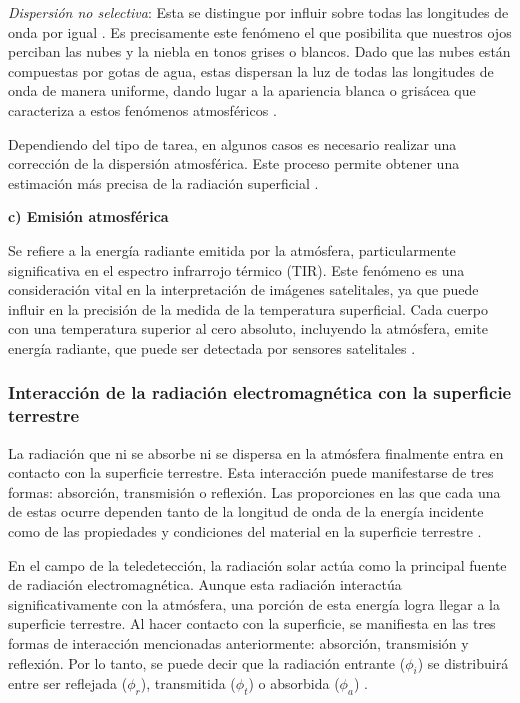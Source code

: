 \textit{Dispersión no selectiva}: Esta se distingue por influir sobre todas las longitudes de onda por igual \cite{canada2007fundamentals, chuvieco2016fundamentals}. Es precisamente este fenómeno el que posibilita que nuestros ojos perciban las nubes y la niebla en tonos grises o blancos. Dado que las nubes están compuestas por gotas de agua, estas dispersan la luz de todas las longitudes de onda de manera uniforme, dando lugar a la apariencia blanca o grisácea que caracteriza a estos fenómenos atmosféricos \cite{tempfli2009principles}.

Dependiendo del tipo de tarea, en algunos casos es necesario realizar una corrección de la dispersión atmosférica. Este proceso permite obtener una estimación más precisa de la radiación superficial \cite{chuvieco2016fundamentals}.

\textbf{c) Emisión atmosférica}

Se refiere a la energía radiante emitida por la atmósfera, particularmente significativa en el espectro infrarrojo térmico (TIR). Este fenómeno es una consideración vital en la interpretación de imágenes satelitales, ya que puede influir en la precisión de la medida de la temperatura superficial. Cada cuerpo con una temperatura superior al cero absoluto, incluyendo la atmósfera, emite energía radiante, que puede ser detectada por sensores satelitales \cite{chuvieco2016fundamentals}.

\subsubsection{Interacción de la radiación electromagnética con la superficie terrestre}

La radiación que ni se absorbe ni se dispersa en la atmósfera finalmente entra en contacto con la superficie terrestre. Esta interacción puede manifestarse de tres formas: absorción, transmisión o reflexión. Las proporciones en las que cada una de estas ocurre dependen tanto de la longitud de onda de la energía incidente como de las propiedades y condiciones del material en la superficie terrestre \cite{canada2007fundamentals}.

En el campo de la teledetección, la radiación solar actúa como la principal fuente de radiación electromagnética. Aunque esta radiación interactúa significativamente con la atmósfera, una porción de esta energía logra llegar a la superficie terrestre. Al hacer contacto con la superficie, se manifiesta en las tres formas de interacción mencionadas anteriormente: absorción, transmisión y reflexión. Por lo tanto, se puede decir que la radiación entrante ($\phi_{i}$) se distribuirá entre ser reflejada ($\phi_{r}$), transmitida ($\phi_{t}$) o absorbida ($\phi_{a}$) \cite{chuvieco2016fundamentals}.

